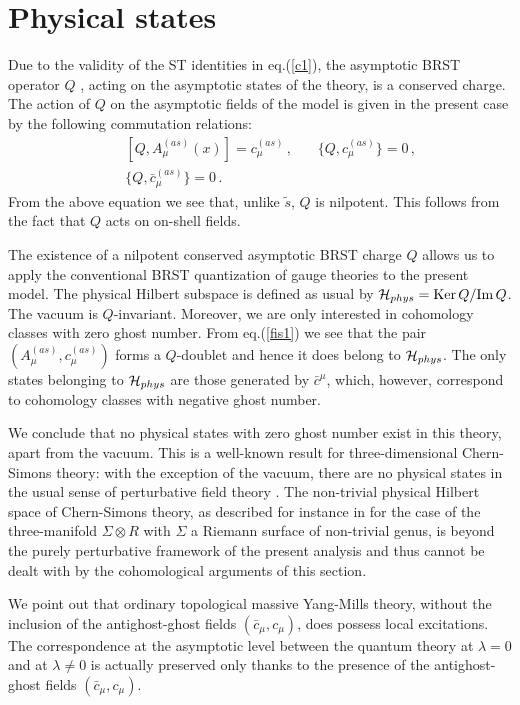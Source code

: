 \documentclass[a4paper,11pt]{article}
\begin{document}
\section{Physical states}\label{sec6}

%
Due to the validity of the ST identities
in eq.(\ref{c1}), the asymptotic BRST operator $Q$ \cite{Curci:1976yb,Kugo:zq,becchi}, 
acting on the asymptotic states
of the theory, is a conserved charge.
The action of $Q$ on the asymptotic fields of the model 
is given in the present case by the following commutation relations:
%
\begin{eqnarray}
&& [Q, A^{(as)}_\mu(x)] = c^{(as)}_\mu \, , ~~~~~~~~ \{ Q, c^{(as)}_\mu \} =0 \, ,\nonumber \\
&& \{ Q, {\bar c}^{(as)}_\mu \} = 0 \, .
 \label{fis1}
\end{eqnarray} 
%
From the above equation we see that, unlike $\tilde s$,
$Q$ is nilpotent.
This follows from the fact that $Q$ acts on on-shell fields.

The existence of a nilpotent conserved asymptotic BRST charge $Q$
allows us to apply 
the conventional BRST quantization of gauge theories
\cite{Weinberg:kr, becchi} to the present model.
The 
physical Hilbert subspace is defined as usual
 by ${\cal H}_{phys} = 
{\rm Ker \, } Q / {\rm Im \, } Q$. 
The vacuum is $Q$-invariant.
Moreover, we are only interested in
cohomology classes with zero ghost number.
From eq.(\ref{fis1}) we see that 
the pair $(A^{(as)}_\mu,c^{(as)}_\mu)$ forms
a $Q$-doublet and hence it does belong to ${\cal H}_{phys}$.
The only states belonging to ${\cal H}_{phys}$ are those
generated by ${\bar c}^\mu$, which, however, correspond to cohomology
classes with negative ghost number.

We conclude that no physical states with zero ghost number 
exist in this theory,
apart from the vacuum.
This is a well-known result for three-dimensional Chern-Simons theory: 
with the exception of the vacuum, there are no
physical states in the usual sense of perturbative field theory
\cite{Guadagnini:1989kr}. 
The non-trivial physical Hilbert space of Chern-Simons theory,
as described for instance in \cite{Witten:1988hf,Birmingham:1991ty} for the case of the three-manifold
$\Sigma \otimes R$ with $\Sigma$ a Riemann surface of non-trivial genus,
is beyond the purely perturbative framework of the present
analysis and thus cannot be dealt with by the cohomological
arguments of this section.

We point out that ordinary topological massive Yang-Mills theory,
without the inclusion of the antighost-ghost fields $(\bar c_\mu,c_\mu)$,
does possess local excitations.
The correspondence at the asymptotic level between the quantum theory
at $\lambda =0$ and at $\lambda \neq 0$ is actually preserved 
only thanks to the presence of the antighost-ghost fields $(\bar c_\mu,c_\mu)$.
\end{document}
